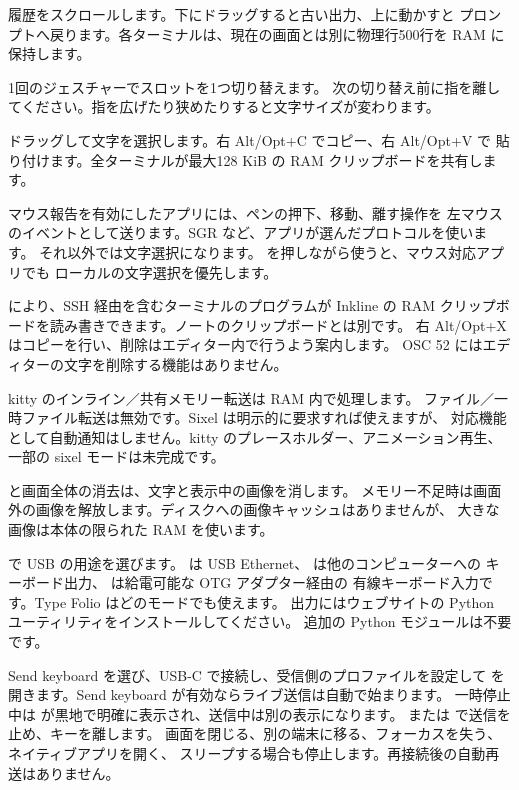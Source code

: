  履歴をスクロールします。下にドラッグすると古い出力、上に動かすと
プロンプトへ戻ります。各ターミナルは、現在の画面とは別に物理行500行を RAM に保持します。

 1回のジェスチャーでスロットを1つ切り替えます。
次の切り替え前に指を離してください。指を広げたり狭めたりすると文字サイズが変わります。

 ドラッグして文字を選択します。右 Alt/Opt+C でコピー、右 Alt/Opt+V で
貼り付けます。全ターミナルが最大128 KiB の RAM クリップボードを共有します。

 マウス報告を有効にしたアプリには、ペンの押下、移動、離す操作を
左マウスのイベントとして送ります。SGR など、アプリが選んだプロトコルを使います。
それ以外では文字選択になります。 を押しながら使うと、マウス対応アプリでも
ローカルの文字選択を優先します。

 により、SSH 経由を含むターミナルのプログラムが Inkline の RAM
クリップボードを読み書きできます。ノートのクリップボードとは別です。
右 Alt/Opt+X はコピーを行い、削除はエディター内で行うよう案内します。
OSC 52 にはエディターの文字を削除する機能はありません。

 kitty のインライン／共有メモリー転送は RAM 内で処理します。
ファイル／一時ファイル転送は無効です。Sixel は明示的に要求すれば使えますが、
対応機能として自動通知はしません。kitty のプレースホルダー、アニメーション再生、
一部の sixel モードは未完成です。

 と画面全体の消去は、文字と表示中の画像を消します。
メモリー不足時は画面外の画像を解放します。ディスクへの画像キャッシュはありませんが、
大きな画像は本体の限られた RAM を使います。

で USB の用途を選びます。
 は USB Ethernet、 は他のコンピューターへの
キーボード出力、 は給電可能な OTG アダプター経由の
有線キーボード入力です。Type Folio はどのモードでも使えます。
出力にはウェブサイトの Python ユーティリティをインストールしてください。
追加の Python モジュールは不要です。

Send keyboard を選び、USB-C で接続し、受信側のプロファイルを設定して
 を開きます。Send keyboard が有効ならライブ送信は自動で始まります。
一時停止中は  が黒地で明確に表示され、送信中は別の表示になります。
 または  で送信を止め、キーを離します。
画面を閉じる、別の端末に移る、フォーカスを失う、ネイティブアプリを開く、
スリープする場合も停止します。再接続後の自動再送はありません。

